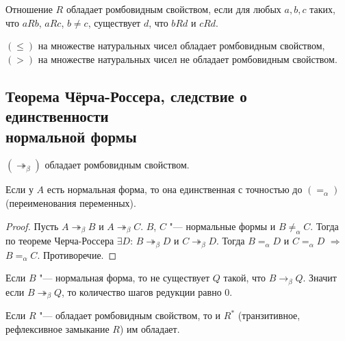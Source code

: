 \begin{definition}
	Отношение $R$ обладает ромбовидным свойством, если для любых $a,b,c$ таких, что $aRb$, $aRc$, $b\neq{}c$, существует $d$, что $bRd$ и $cRd$.
\end{definition}

\begin{example}
	$(\leq)$ на множестве натуральных чисел обладает ромбовидным свойством,
	$(>)$ на множестве натуральных чисел не обладает ромбовидным свойством.
\end{example}

\subsection{Теорема Чёрча-Россера, следствие о единственности \\нормальной формы}

\begin{theorem}
	$(\twoheadrightarrow_{\beta})$ обладает ромбовидным свойством.
\end{theorem}


\begin{cons}
	Если у $A$ есть нормальная форма, то она единственная с точностью до $(=_{\alpha})$ (переименования переменных).
\end{cons}

\begin{proof}
	Пусть $A\twoheadrightarrow_{\beta}B$ и $A\twoheadrightarrow_{\beta}C$. $B$, $C$ "--- нормальные формы и $B\neq_{\alpha}C$. 
	Тогда по теореме Черча-Россера $\exists{}D$: $B\twoheadrightarrow_{\beta}D$ и $C\twoheadrightarrow_{\beta}D$. Тогда $B=_{\alpha}D$ и $C=_{\alpha} D$ $\Rightarrow$ $B=_{\alpha}C$. Противоречие.
\end{proof}

\begin{lemma}
	Если $B$ "--- нормальная форма, то не существует $Q$ такой, что $B\to_{\beta}Q$. Значит если $B\twoheadrightarrow_{\beta}Q$, то количество шагов редукции равно 0.
\end{lemma}

\begin{lemma}
	 \label{refl}
	Если $R$ "--- обладает ромбовидным свойством, то и $R^{*}$ (транзитивное, рефлексивное замыкание $R$) им обладает.
\end{lemma}

